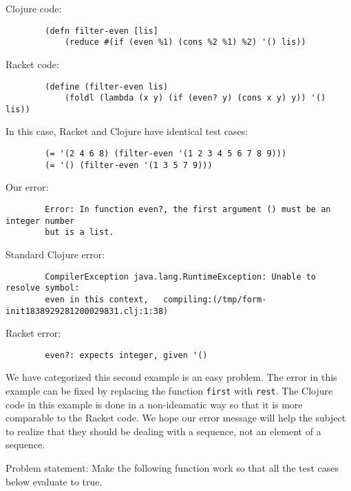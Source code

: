 \documentclass[12pt]{article}
\begin{document}
	Clojure code:
\begin{verbatim}
		(defn filter-even [lis] 
			(reduce #(if (even %1) (cons %2 %1) %2) '() lis))
\end{verbatim}
	Racket code:
\begin{verbatim}
		(define (filter-even lis) 
			(foldl (lambda (x y) (if (even? y) (cons x y) y)) '() lis))
\end{verbatim}
	In this case, Racket and Clojure have identical test cases: 

\begin{verbatim}
		(= '(2 4 6 8) (filter-even '(1 2 3 4 5 6 7 8 9)))
		(= '() (filter-even '(1 3 5 7 9)))
\end{verbatim}

	Our error:
\begin{verbatim}
		Error: In function even?, the first argument () must be an integer number 
		but is a list.
\end{verbatim}

	Standard Clojure error:
\begin{verbatim}
		CompilerException java.lang.RuntimeException: Unable to resolve symbol: 
		even in this context, 	compiling:(/tmp/form-init1838929281200029831.clj:1:38) 
\end{verbatim}

	Racket error:
\begin{verbatim}
		even?: expects integer, given '()
\end{verbatim}


	We have categorized this second example is an easy problem.
	The error in this example can be fixed by replacing the function \texttt{first} with \texttt{rest}.
	The Clojure code in this example is done in a non-ideamatic way so that it is more comparable to the Racket code.
	We hope our error message will help the subject to realize that they should be dealing with a sequence, not an element of a sequence. 
	
	
	

	Problem statement:
		Make the following function work so that all the test cases below evaluate to true. 
		
\end{document}
